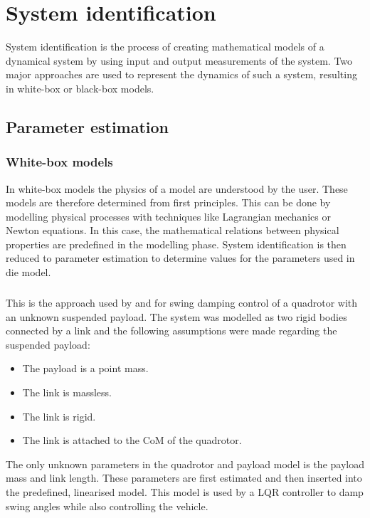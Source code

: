 \graphicspath{{system_id/fig/}}

\chapter{System identification}
\label{chap:system_id}

    \par
    System identification is the process of creating mathematical models of a dynamical system by using input and output measurements of the system.
    Two major approaches are used to represent the dynamics of such a system, resulting in white-box or black-box models.

 
\section{Parameter estimation} 

    \subsection{White-box models}

        In white-box models the physics of a model are understood by the user.    
        These models are therefore determined from first principles.
        This can be done by modelling physical processes with techniques like Lagrangian mechanics or Newton equations.
        In this case, the mathematical relations between physical properties are predefined in the modelling phase.
        System identification is then reduced to parameter estimation to determine values for the parameters used in die model.
        
        \paragraph{} 
        This is the approach used by \cite{erasmus} and \cite{slabber} for swing damping control of a quadrotor with an unknown suspended payload.
        The system was modelled as two rigid bodies connected by a link and the following assumptions were made regarding the suspended payload:
        \begin{itemize}
            \item The payload is a point mass.
            \item The link is massless.
            \item The link is rigid.
            \item The link is attached to the CoM of the quadrotor.
        \end{itemize}
        The only unknown parameters in the quadrotor and payload model is the payload mass and link length.
        These parameters are first estimated and then inserted into the predefined, linearised model.
        This model is used by a LQR controller to damp swing angles while also controlling the vehicle.

